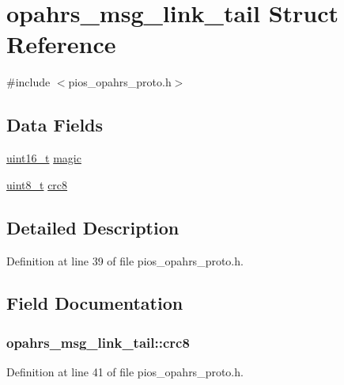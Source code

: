 \hypertarget{structopahrs__msg__link__tail}{\section{opahrs\-\_\-msg\-\_\-link\-\_\-tail Struct Reference}
\label{structopahrs__msg__link__tail}
}


{\ttfamily \#include $<$pios\-\_\-opahrs\-\_\-proto.\-h$>$}

\subsection*{Data Fields}
\begin{DoxyCompactItemize}
\item 
\hyperlink{stdint_8h_a273cf69d639a59973b6019625df33e30}{uint16\-\_\-t} \hyperlink{structopahrs__msg__link__tail_a47a2201e7c241f5553cf4a77129b3697}{magic}
\item 
\hyperlink{stdint_8h_aba7bc1797add20fe3efdf37ced1182c5}{uint8\-\_\-t} \hyperlink{structopahrs__msg__link__tail_acd17e0272bb3fce808ebd0e9a50f9eb8}{crc8}
\end{DoxyCompactItemize}


\subsection{Detailed Description}


Definition at line 39 of file pios\-\_\-opahrs\-\_\-proto.\-h.



\subsection{Field Documentation}
\hypertarget{structopahrs__msg__link__tail_acd17e0272bb3fce808ebd0e9a50f9eb8}{
\subsubsection[{crc8}]{ opahrs\-\_\-msg\-\_\-link\-\_\-tail\-::crc8}}\label{structopahrs__msg__link__tail_acd17e0272bb3fce808ebd0e9a50f9eb8}


Definition at line 41 of file pios\-\_\-opahrs\-\_\-proto.\-h.

